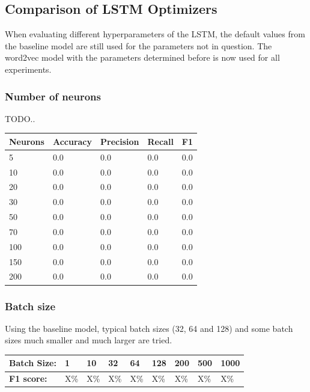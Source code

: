 \documentclass[
	a4paper,
	pagesize,
	pdftex,
	12pt,
	twoside, %
	BCOR=5mm, %
	ngerman,
	fleqn,
	final,
	]{scrartcl}
\begin{document}
\subsection{Comparison of LSTM Optimizers}

When evaluating different hyperparameters of the LSTM, the default values from the baseline model are still used for the parameters not in question. The word2vec model with the parameters determined before is now used for all experiments.

\subsubsection{Number of neurons}

TODO..


\begin{tabular}{ | p{2cm} || p{2cm}|p{2cm}|p{2cm}|p{2cm}|  }
	\hline
	Neurons & Accuracy & Precision & Recall & F1 \\
	\hline
	5 & 0.0 &  0.0 &  0.0 &  0.0 \\
	10 & 0.0 &  0.0 &  0.0 &  0.0 \\
	20 & 0.0 &  0.0 &  0.0 &  0.0 \\
	30 & 0.0 &  0.0 &  0.0 &  0.0 \\
	50 & 0.0 &  0.0 &  0.0 &  0.0 \\
	70 & 0.0 &  0.0 &  0.0 &  0.0 \\
	100 & 0.0 &  0.0 &  0.0 &  0.0 \\
	150 & 0.0 &  0.0 &  0.0 &  0.0 \\
	200 & 0.0 &  0.0 &  0.0 &  0.0 \\
	\hline
	\hline
\end{tabular}



\subsubsection{Batch size}

Using the baseline model, typical batch sizes (32, 64 and 128) and some batch sizes much smaller and much larger are tried.

\begin{tabular} { | p{3cm} || p{0.8cm} | p{0.8cm} |  p{0.8cm} | p{0.8cm}  | p{0.8cm} | p{0.8cm} | p{0.8cm}| p{0.8cm} |}
	\hline
	\textbf{Batch Size:}  & 1 & 10 & 32 & 64 & 128 & 200 & 500 & 1000\\   
	\hline
	\textbf{F1 score:} & X\% & X\% & X\% & X\% & X\% & X\% & X\% & X\% \\
	\hline
	\hline
\end{tabular}
\end{document}
